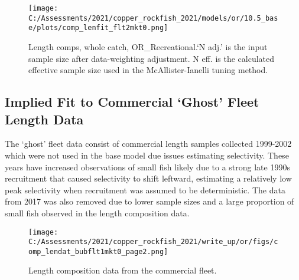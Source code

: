 \documentclass[11pt,
  english,
  a4paper,
]{article}
\begin{document}

\begin{figure}
\centering
\texttt{[image: C:/Assessments/2021/copper\_rockfish\_2021/models/or/10.5\_base/plots/comp\_lenfit\_flt2mkt0.png]}
\caption{Length comps, whole catch, OR\_Recreational.`N adj.' is the input sample size after data-weighting adjustment. N eff. is the calculated effective sample size used in the McAllister-Ianelli tuning method.\label{fig:comp_lenfit_flt2mkt0}}
\end{figure}

\tagmcend\tagstructend

\clearpage


\hypertarget{append-com}{%
\subsection{Implied Fit to Commercial `Ghost' Fleet Length Data}\label{append-com}}

\leavevmode\tagmcend\tagstructend


The `ghost' fleet data consist of commercial length samples collected 1999-2002 which were not used in the base model due issues estimating selectivity. These years have increased observations of small fish likely due to a strong late 1990s recruitment that caused selectivity to shift leftward, estimating a relatively low peak selectivity when recruitment was assumed to be deterministic. The data from 2017 was also removed due to lower sample sizes and a large proportion of small fish observed in the length composition data.

\leavevmode\tagmcend\tagstructend\par


\begin{figure}
\centering
\texttt{[image: C:/Assessments/2021/copper\_rockfish\_2021/write\_up/or/figs/comp\_lendat\_bubflt1mkt0\_page2.png]}
\caption{Length composition data from the commercial fleet.\label{fig:ghost-com-len-data}}
\end{figure}
\end{document}
